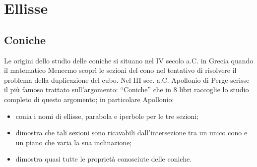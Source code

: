 
\chapter{Ellisse}

% 

% 


\section{Coniche}
\label{sec:ellisse_coniche}
  
  Le origini dello studio delle coniche si situano nel IV secolo a.C. 
in Grecia quando il matematico Menecmo scoprì le sezioni del cono nel 
tentativo di risolvere il problema della duplicazione del cubo. Nel III 
sec. a.C. Apollonio di Perge scrisse il più famoso trattato sull'argomento: 
``Coniche'' che in 8 libri raccoglie lo studio completo di questo 
argomento; in particolare Apollonio:
\begin{itemize} [nosep]
  \item conia i nomi di ellisse, parabola e iperbole per le 
tre sezioni;
  \item dimostra che tali sezioni sono ricavabili dall'intersezione tra un 
unico cono e un piano che  varia la sua inclinazione;
  \item dimostra quasi tutte le proprietà conosciute delle coniche.
\end{itemize}

